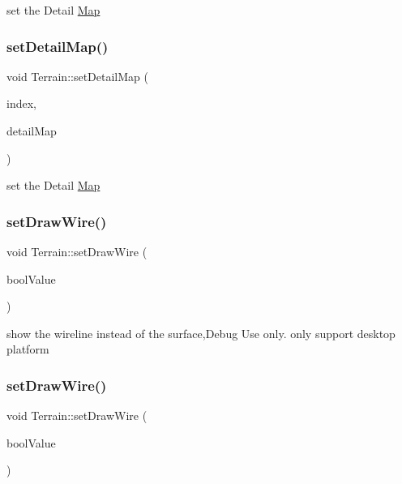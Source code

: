 set the Detail \hyperlink{classMap}{Map} \mbox{\label{classTerrain_a13ab12df5850aab66f6f45e396c4f169}} 
\subsubsection{\texorpdfstring{set\+Detail\+Map()}{setDetailMap()}\hspace{0.1cm}{\footnotesize\ttfamily [2/2]}}
{\footnotesize\ttfamily void Terrain\+::set\+Detail\+Map (\begin{DoxyParamCaption}\item[{unsigned int}]{index,  }\item[{\hyperlink{structTerrain_1_1DetailMap}{Detail\+Map}}]{detail\+Map }\end{DoxyParamCaption})}

set the Detail \hyperlink{classMap}{Map} \mbox{\label{classTerrain_ae29ad24c1f6056a45dd8fafb480bdff8}} 
\subsubsection{\texorpdfstring{set\+Draw\+Wire()}{setDrawWire()}\hspace{0.1cm}{\footnotesize\ttfamily [1/2]}}
{\footnotesize\ttfamily void Terrain\+::set\+Draw\+Wire (\begin{DoxyParamCaption}\item[{bool}]{bool\+Value }\end{DoxyParamCaption})}

show the wireline instead of the surface,Debug Use only.  only support desktop platform \mbox{\label{classTerrain_ae29ad24c1f6056a45dd8fafb480bdff8}} 
\subsubsection{\texorpdfstring{set\+Draw\+Wire()}{setDrawWire()}\hspace{0.1cm}{\footnotesize\ttfamily [2/2]}}
{\footnotesize\ttfamily void Terrain\+::set\+Draw\+Wire (\begin{DoxyParamCaption}\item[{bool}]{bool\+Value }\end{DoxyParamCaption})}

